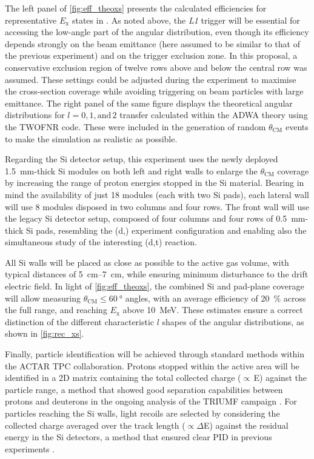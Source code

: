 \documentclass[a4paper, 10pt]{article}
\newcommand{\iso}[2]{\ce{^{#1}#2}}
\newcommand{\ex}{\ensuremath{E_{\text{x}}}\xspace}
\begin{document}
The left panel of \autoref{fig:eff_theoxs} presents the calculated efficiencies for representative \ex states in \iso{18}{C}. As noted above, the \textit{L1} trigger will be essential for accessing the low-angle part of the angular distribution, even though its efficiency depends strongly on the beam emittance (here assumed to be similar to that of the previous \iso{20}{O} experiment) and on the trigger exclusion zone. In this proposal, a conservative exclusion region of twelve rows above and below the central row was assumed. These settings could be adjusted during the experiment to maximise the cross-section coverage while avoiding triggering on beam particles with large emittance. The right panel of the same figure displays the theoretical angular distributions for $l=0, 1, \text{and}\, 2$ transfer calculated within the ADWA theory using the TWOFNR code. These were included in the generation of random $\theta_{\text{CM}}$ events to make the simulation as realistic as possible.

Regarding the Si detector setup, this experiment uses the newly deployed \qty{1.5}{\mm}-thick Si modules on both left and right walls to enlarge the $\theta_{\text{CM}}$ coverage by increasing the range of proton energies stopped in the Si material. Bearing in mind the availability of just 18 modules (each with two Si pads), each lateral wall will use 8 modules disposed in two columns and four rows. The front wall will use the legacy Si detector setup, composed of four columns and four rows of \qty{0.5}{\mm}-thick Si pads, resembling the \iso{20}{O}(d,\iso{3}{He})\iso{19}{N} experiment configuration \cite{loisfuentes2026} and enabling also the simultaneous study of the interesting \iso{17}{C}(d,t)\iso{16}{C} reaction.

All Si walls will be placed as close as possible to the active gas volume, with typical distances of \qtyrange{5}{7}{\cm}, while ensuring minimum disturbance to the drift electric field. In light of \autoref{fig:eff_theoxs}, the combined Si and pad-plane coverage will allow measuring $\theta_{\text{CM}} \leq \qty{60}{\degree}$ angles, with an average efficiency of \qty{20}{\percent} across the full range, and reaching \ex above \qty{10}{\MeV}. These estimates ensure a correct distinction of the different characteristic $l$ shapes of the angular distributions, as shown in \autoref{fig:rec_xs}.

Finally, particle identification will be achieved through standard methods within the ACTAR TPC collaboration. Protons stopped within the active area will be identified in a 2D matrix containing the total collected charge ($\propto\,$E) against the particle range, a method that showed good separation capabilities between protons and deuterons in the ongoing analysis of the TRIUMF campaign \cite{blanco-calvino-thesis}. For particles reaching the Si walls, light recoils are selected by considering the collected charge averaged over the track length ($\propto \Delta$E) against the residual energy in the Si detectors, a method that ensured clear PID in previous experiments \cite{loisfuentes2026,lozano-gonzalez2026a}.
\end{document}
